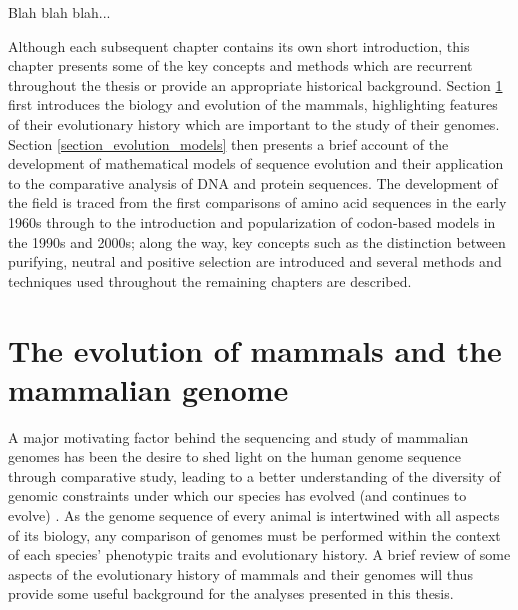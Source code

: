 Blah blah blah...

Although each subsequent chapter contains its own short introduction,
this chapter presents some of the key concepts and methods which are
recurrent throughout the thesis or provide an appropriate historical
background. Section \ref{section_mammal_evolution} first introduces
the biology and evolution of the mammals, highlighting features of
their evolutionary history which are important to the study of their
genomes. Section \ref{section_evolution_models} then presents a brief
account of the development of mathematical models of sequence
evolution and their application to the comparative analysis of DNA and
protein sequences. The development of the field is traced from the
first comparisons of amino acid sequences in the early 1960s through
to the introduction and popularization of codon-based models in the
1990s and 2000s; along the way, key concepts such as the distinction
between purifying, neutral and positive selection are introduced and
several methods and techniques used throughout the remaining chapters
are described.

\section{The evolution of mammals and the mammalian genome}
\label{section_mammal_evolution}

A major motivating factor behind the sequencing and study of mammalian
genomes has been the desire to shed light on the human genome sequence
through comparative study, leading to a better understanding of the
diversity of genomic constraints under which our species has evolved
(and continues to evolve) \citep{Mouse2002Initial}. As the genome
sequence of every animal is intertwined with all aspects of its
biology, any comparison of genomes must be performed within the
context of each species' phenotypic traits and evolutionary history. A
brief review of some aspects of the evolutionary history of mammals
and their genomes will thus provide some useful background for the
analyses presented in this thesis.

